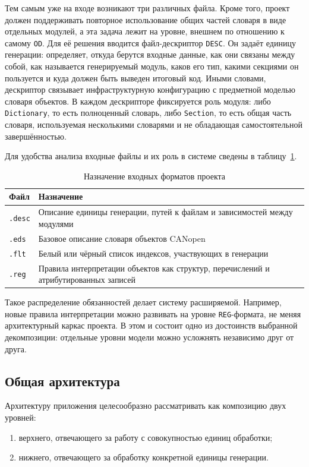 \documentclass[a4paper,12pt]{article}
\begin{document}
Тем самым уже на входе возникают три различных файла. Кроме того, проект должен
поддерживать повторное использование общих частей словаря в виде отдельных модулей, а
эта задача лежит на уровне, внешнем по отношению к самому \texttt{OD}. Для её решения
вводится файл-дескриптор \texttt{DESC}. Он задаёт единицу генерации: определяет, откуда
берутся входные данные, как они связаны между собой, как называется генерируемый модуль,
каков его тип, какими секциями он пользуется и куда должен быть выведен итоговый код.
Иными словами, дескриптор связывает инфраструктурную конфигурацию с предметной моделью
словаря объектов. В каждом дескрипторе фиксируется роль модуля: либо \texttt{Dictionary},
то есть полноценный словарь, либо \texttt{Section}, то есть общая часть словаря,
используемая несколькими словарями и не обладающая самостоятельной завершённостью.

Для удобства анализа входные файлы и их роль в системе сведены в таблицу~\ref{tab:inputs}.

\begin{table}[H]
\centering
\caption{Назначение входных форматов проекта}
\label{tab:inputs}
\small
\begin{tabular}{|p{22mm}|p{128mm}|}
\hline
\textbf{Файл} & \textbf{Назначение} \\
\hline
\texttt{.desc} & Описание единицы генерации, путей к файлам и зависимостей между модулями \\
\hline
\texttt{.eds} & Базовое описание словаря объектов CANopen \\
\hline
\texttt{.flt} & Белый или чёрный список индексов, участвующих в генерации \\
\hline
\texttt{.reg} & Правила интерпретации объектов как структур, перечислений и атрибутированных записей \\
\hline
\end{tabular}
\end{table}

Такое распределение обязанностей делает систему расширяемой. Например, новые правила
интерпретации можно развивать на уровне \texttt{REG}-формата,
не меняя архитектурный каркас проекта. В
этом и состоит одно из достоинств выбранной декомпозиции: отдельные уровни модели
можно усложнять независимо друг от друга.

\subsection{Общая архитектура}

Архитектуру приложения целесообразно рассматривать как композицию двух уровней:
\begin{enumerate}
  \item верхнего, отвечающего за работу с совокупностью единиц обработки;
  \item нижнего, отвечающего за обработку конкретной единицы генерации.
\end{enumerate}
\end{document}
